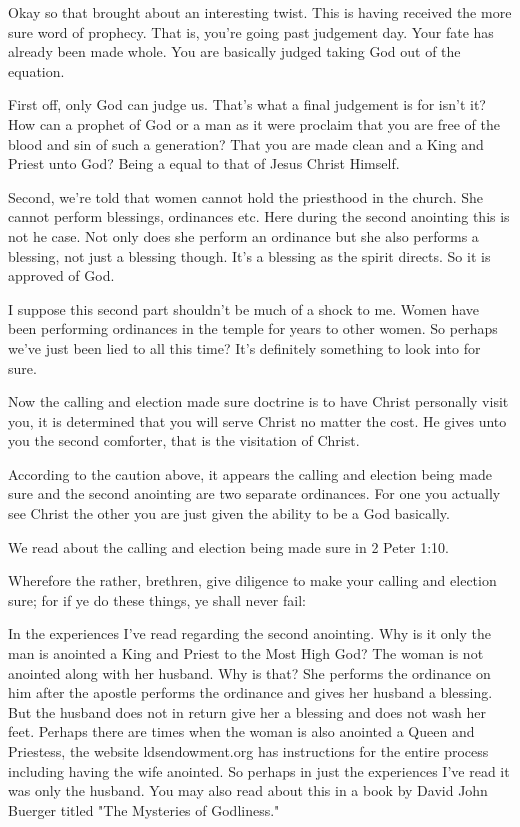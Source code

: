  Okay so that brought about an interesting twist. This is having received the 
 more sure word of prophecy. That is, you’re going past judgement day. Your fate 
 has already been made whole. You are basically judged taking God out of the 
 equation.
 
 First off, only God can judge us. That’s what a final judgement is for isn’t 
 it? How can a prophet of God or a man as it were proclaim that you are free of 
 the blood and sin of such a generation? That you are made clean and a King and 
 Priest unto God? Being a equal to that of Jesus Christ Himself.
 
 Second, we’re told that women cannot hold the priesthood in the church. She 
 cannot perform blessings, ordinances etc. Here during the second anointing this 
 is not he case. Not only does she perform an ordinance but she also performs a 
 blessing, not just a blessing though. It’s a blessing as the spirit directs. 
 So it is approved of God.
 
 I suppose this second part shouldn’t be much of a shock to me. Women have been 
 performing ordinances in the temple for years to other women. So perhaps we’ve 
 just been lied to all this time? It’s definitely something to look into for 
 sure.
 
 Now the calling and election made sure doctrine is to have Christ personally 
 visit you, it is determined that you will serve Christ no matter the cost. He 
 gives unto you the second comforter, that is the visitation of Christ.
 
 According to the caution above, it appears the calling and election being made 
 sure and the second anointing are two separate ordinances. For one you actually 
 see Christ the other you are just given the ability to be a God basically.
 
 We read about the calling and election being made sure in 2 Peter 1:10.
 
 \begin{displayquote}
 Wherefore the rather, brethren, give diligence to make your calling and 
 election sure; for if ye do these things, ye shall never fail:
 \end{displayquote}
 
 In the experiences I’ve read regarding the second anointing. Why is it only the 
 man is anointed a King and Priest to the Most High God? The woman is not 
 anointed along with her husband. Why is that? She performs the ordinance on him 
 after the apostle performs the ordinance and gives her husband a blessing. But 
 the husband does not in return give her a blessing and does not wash her feet. 
 Perhaps there are times when the woman is also anointed a Queen and Priestess, 
 the website ldsendowment.org has instructions for the entire process including 
 having the wife anointed. So perhaps in just the experiences I’ve read it was 
 only the husband. You may also read about this in a book by David John Buerger 
 titled "The Mysteries of Godliness."

